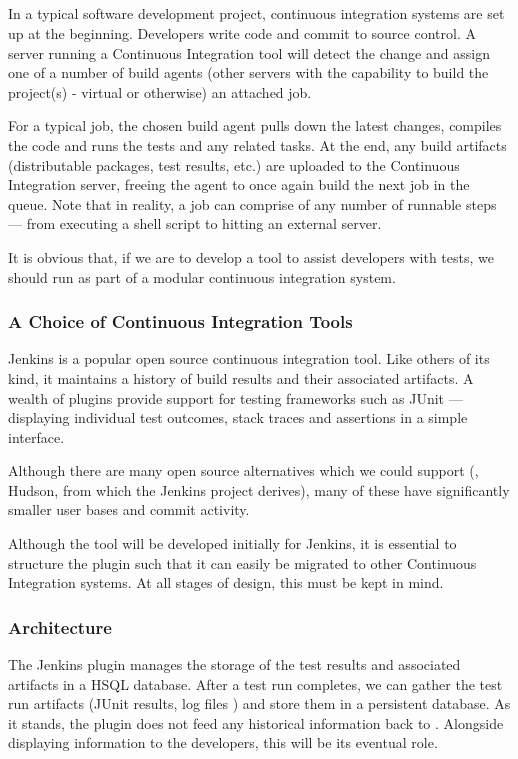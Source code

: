 \subsection{\jenkinsPlugin}
\label{sec:sec:jenkins_plugin}

In a typical software development project, continuous integration systems are
set up at the beginning. Developers write code and commit to source control. A
server running a Continuous Integration tool will detect the change and assign
one of a number of build agents (other servers with the capability to build the
project(s) - virtual or otherwise) an attached job.

For a typical job, the chosen build agent pulls down the latest changes,
compiles the code and runs the tests and any related tasks. At the end, any
build artifacts (distributable packages, test results, etc.) are uploaded to the
Continuous Integration server, freeing the agent to once again build the next
job in the queue. Note that in reality, a job can comprise of any number of
runnable steps --- from executing a shell script to hitting an external server.

It is obvious that, if we are to develop a tool to assist developers with \flaky
tests, we should run as part of a modular continuous integration system.

\subsubsection{A Choice of Continuous Integration Tools}

Jenkins \cite{Jenkins} is a popular open source continuous integration tool.
Like others of its kind, it maintains a history of build results and their
associated artifacts. A wealth of plugins provide support for testing frameworks
such as JUnit --- displaying individual test outcomes, stack traces and
assertions in a simple interface.

Although there are many open source alternatives which we could support (\eg,
Hudson, from which the Jenkins project derives), many of these have
significantly smaller user bases and commit activity.

Although the tool will be developed initially for Jenkins, it is essential to
structure the plugin such that it can easily be migrated to other Continuous
Integration systems. At all stages of design, this must be kept in mind.


\subsubsection{Architecture}

The Jenkins plugin manages the storage of the test results and associated
artifacts in a HSQL database. After a test run completes, we can gather the test
run artifacts (JUnit results,  log files \etc) and store them
in a persistent database. As it stands, the plugin does not feed any historical
information back to \venera. Alongside displaying information to the developers,
this will be its eventual role.

